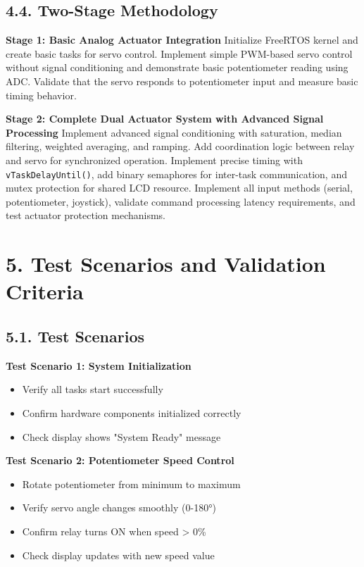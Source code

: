 \documentclass[12pt]{article}
\begin{document}
\subsection*{4.4. Two-Stage Methodology}

\textbf{Stage 1: Basic Analog Actuator Integration}
\newline
Initialize FreeRTOS kernel and create basic tasks for servo control. Implement simple PWM-based servo control without signal conditioning and demonstrate basic potentiometer reading using ADC. Validate that the servo responds to potentiometer input and measure basic timing behavior.

\textbf{Stage 2: Complete Dual Actuator System with Advanced Signal Processing}
\newline
Implement advanced signal conditioning with saturation, median filtering, weighted averaging, and ramping. Add coordination logic between relay and servo for synchronized operation. Implement precise timing with \texttt{vTaskDelayUntil()}, add binary semaphores for inter-task communication, and mutex protection for shared LCD resource. Implement all input methods (serial, potentiometer, joystick), validate command processing latency requirements, and test actuator protection mechanisms.

\section*{5. Test Scenarios and Validation Criteria}

\subsection*{5.1. Test Scenarios}

\textbf{Test Scenario 1: System Initialization}
\begin{itemize}
    \item Verify all tasks start successfully
    \item Confirm hardware components initialized correctly
    \item Check display shows "System Ready" message
\end{itemize}

\textbf{Test Scenario 2: Potentiometer Speed Control}
\begin{itemize}
    \item Rotate potentiometer from minimum to maximum
    \item Verify servo angle changes smoothly (0-180°)
    \item Confirm relay turns ON when speed > 0\%
    \item Check display updates with new speed value
\end{itemize}
\end{document}

